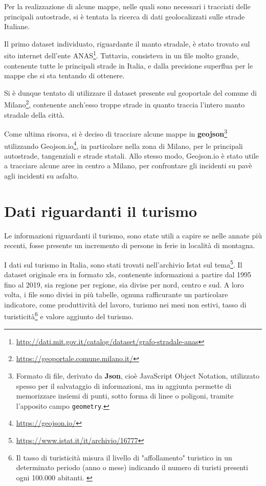 \documentclass[a4paper,12pt]{report}
\newcommand{\columnstyle}[1]{\texttt{#1}}
\begin{document}
Per la realizzazione di alcune mappe, nelle quali sono necessari i tracciati delle principali 
autostrade, si è tentata la ricerca di dati geolocalizzati sulle strade Italiane.

Il primo dataset individuato, riguardante il manto  stradale, è stato trovato sul sito 
internet dell'ente  
ANAS\footnote{\url{http://dati.mit.gov.it/catalog/dataset/grafo-stradale-anas}}. 
Tuttavia, consisteva in un file molto grande, contenente tutte le principali 
strade in Italia, e dalla precisione superflua per le mappe che si sta tentando di ottenere.

Si è dunque tentato di utilizzare il dataset presente sul geoportale del comune di 
Milano\footnote{\url{https://geoportale.comune.milano.it/}}, 
contenente anch'esso troppe strade in quanto traccia l'intero manto stradale della città.

Come ultima risorsa, si è deciso di tracciare alcune mappe in 
\textbf{geojson}\footnote{Formato di file, derivato da \textbf{Json}, cioè 
JavaScript Object Notation, utilizzato spesso per il salvataggio di informazioni, ma 
in aggiunta permette di memorizzare insiemi di punti, sotto forma di linee o poligoni, 
tramite l'apposito campo \columnstyle{geometry}.} utilizzando 
Geojson.io\footnote{\url{https://geojson.io/}}, in particolare nella zona di Milano, 
per le principali autostrade, tangenziali e strade statali. 
Allo stesso modo, Geojson.io è stato utile a tracciare alcune aree in centro a Milano, 
per confrontare gli incidenti su pavè agli incidenti su asfalto.

\section{Dati riguardanti il turismo}

Le informazioni riguardanti il turismo, sono state utili a capire se nelle annate più 
recenti, fosse presente un incremento di persone in ferie in località di montagna.

I dati sul turismo in Italia, sono stati trovati nell'archivio Istat sul 
tema\footnote{\url{https://www.istat.it/it/archivio/16777}}.
Il dataset originale era in formato xls, contenente informazioni a partire dal 1995 
fino al 2019, sia regione per regione, sia divise per nord, centro e sud.
A loro volta, i file sono divisi in più tabelle, ognuna rafficurante un particolare 
indicatore, come produttività del lavoro, turismo nei mesi non estivi, 
tasso di turisticità\footnote{Il tasso di turisticità misura il livello di "affollamento" 
turistico in un determinato periodo (anno o mese) indicando il numero di turisti presenti 
ogni 100.000 abitanti. \cite{ONTIT:1}} 
e valore aggiunto del turismo.
\end{document}
